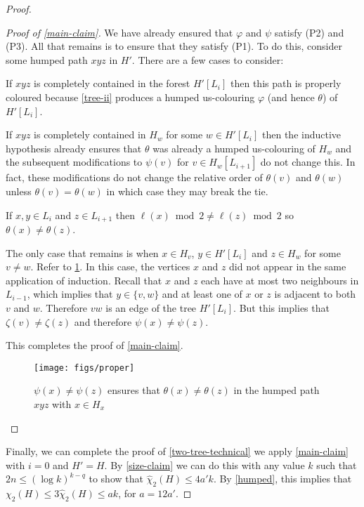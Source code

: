 \documentclass[kpfonts]{patmorin}
\newcommand{\uqs}{\chi_2}
\newcommand{\hus}{\hat{\chi}_2}
\begin{document}
\begin{proof}
\begin{proof}[Proof of \cref{main-claim}]
       We have already ensured that $\varphi$ and $\psi$ satisfy (P2) and (P3). All that remains is to ensure that they satisfy (P1).  To do this, consider some humped path $xyz$ in $H'$.  There are a few cases to consider:
       \begin{compactenum}
          \item If $xyz$ is completely contained in the forest $H'[L_i]$ then this path is properly coloured because \cref{tree-ii} produces a humped us-colouring $\varphi$ (and hence $\theta$) of $H'[L_i]$.
          \item If $xyz$ is completely contained in $H_w$ for some $w\in H'[L_i]$ then the inductive hypothesis already ensures that $\theta$ was already a humped us-colouring of $H_w$ and the subsequent modifications to $\psi(v)$ for $v\in H_w[L_{i+1}]$ do not change this. In fact, these modifications do not change the relative order of $\theta(v)$ and $\theta(w)$ unless $\theta(v)=\theta(w)$ in which case they may break the tie.
          \item If $x,y\in L_i$ and $z\in L_{i+1}$ then $\ell(x)\bmod 2\neq\ell(z)\bmod 2$ so $\theta(x)\neq\theta(z)$.
          \item The only case that remains is when $x\in H_{v}$, $y\in H'[L_i]$ and $z\in H_w$ for some $v\neq w$. Refer to \cref{proper}.  In this case, the vertices $x$ and $z$ did not appear in the same application of induction.  Recall that $x$ and $z$ each have at most two neighbours in $L_{i-1}$, which implies that $y\in\{v,w\}$ and at least one of $x$ or $z$ is adjacent to both $v$ and $w$.  Therefore $vw$ is an edge of the tree $H'[L_i]$.  But this implies that $\zeta(v)\neq\zeta(z)$ and therefore $\psi(x)\neq\psi(z)$.
      \end{compactenum}
      This completes the proof of \cref{main-claim}.
       \begin{figure}
           \begin{center}
            \texttt{[image: figs/proper]}
            \end{center}
           \caption{$\psi(x)\neq\psi(z)$ ensures that $\theta(x)\neq \theta(z)$ in the humped path $xyz$ with $x\in H_x$}
           \label{proper}
       \end{figure}
    \end{proof}
    Finally, we can complete the proof of \cref{two-tree-technical} we apply \cref{main-claim} with $i=0$ and $H'=H$.  By \cref{size-claim} we can do this with any value $k$ such that $2n \le (\log k)^{k-q}$ to show that $\hus(H)\le 4a'k$.  By \cref{humped}, this implies that $\uqs(H)\le 3\hus(H)\le ak$, for $a=12a'$.
\end{proof}
\end{document}
